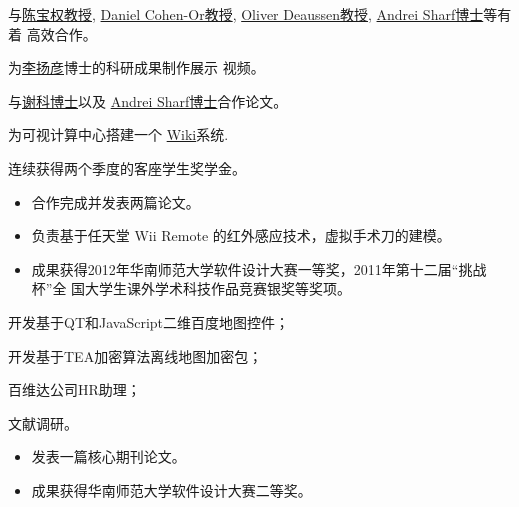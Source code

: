 \documentclass[11pt,a4paper,nolmodern]{moderncv}
\begin{document}

{
\begin{tightitemize}%
 \item 与\href{http://web.siat.ac.cn/~baoquan/}{陈宝权教授},
   \href{http://www.math.tau.ac.il/~dcor/}{Daniel Cohen-Or教授},
   \href{http://graphics.uni-konstanz.de/mitarbeiter/deussen.php}{Oliver
     Deaussen教授}, \href{http://www.idav.ucdavis.edu/~asharf/}{Andrei Sharf博士}等有着
   高效合作。
 \item 为\href{http://web.siat.ac.cn/~yangyan/}{李扬彦}博士的科研成果制作展示
   视频。
 \item 与\href{http://web.siat.ac.cn/~kexie}{谢科博士}以及
   \href{http://www.idav.ucdavis.edu/~asharf/}{Andrei Sharf博士}合作论文。
 \item 为可视计算中心搭建一个
   \href{http://vcc.siat.ac.cn/w/index.php/Main_Page}{Wiki}系统.   
 \item 连续获得两个季度的客座学生奖学金。
 \end{tightitemize}}

%
  {
\begin{itemize}
 \item 合作完成并发表两篇论文。
 \item 负责基于任天堂 Wii Remote 的红外感应技术，虚拟手术刀的建模。
 \item 成果获得2012年华南师范大学软件设计大赛一等奖，2011年第十二届“挑战杯”全
   国大学生课外学术科技作品竞赛银奖等奖项。
\end{itemize}}

{
\begin{tightitemize}%
 \item 开发基于QT和JavaScript二维百度地图控件；
 \item 开发基于TEA加密算法离线地图加密包；
 \item 百维达公司HR助理；
 \item 文献调研。
 \end{tightitemize}}

%
  {
\begin{itemize}
 \item 发表一篇核心期刊论文。
 \item 成果获得华南师范大学软件设计大赛二等奖。
\end{itemize}}
\end{document}
